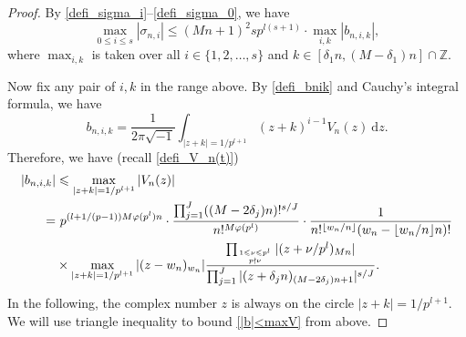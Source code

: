 \documentclass[12pt]{article}
\numberwithin{equation}{section}
\begin{document}
\begin{proof}
By \eqref{defi_sigma_i}--\eqref{defi_sigma_0}, we have
\begin{equation}\label{sigma<b}
\max_{0 \leqslant i \leqslant s} |\sigma_{n,i}| \leqslant (Mn+1)^{2}sp^{l(s+1)} \cdot \max_{i,k} |b_{n,i,k}|, 
\end{equation}
where $\max_{i,k}$ is taken over all $i \in \{ 1,2,\ldots,s \}$ and $k \in [\delta_1n, (M-\delta_1)n] \cap \mathbb{Z}$. 

Now fix any pair of $i,k$ in the range above. By \eqref{defi_bnik} and Cauchy's integral formula, we have
\[ b_{n,i,k} = \frac{1}{2\pi \sqrt{-1}} \int_{|z+k|=1/p^{l+1}} (z+k)^{i-1}V_n(z)~\mathrm{d}z. \]
Therefore, we have (recall \eqref{defi_V_n(t)})
\begin{align}
	|b_{n,i,k}| &\leqslant \max_{|z+k| = 1/p^{l+1}} |V_n(z)| \notag\\
	=&~ p^{(l+1/(p-1))M\varphi(p^{l})n} \cdot \frac{\prod_{j=1}^{J} ((M-2\delta_j)n)!^{s/J}}{n!^{M\varphi(p^{l})}} \cdot \frac{1}{n!^{\lfloor w_n / n\rfloor}(w_n-\lfloor w_n / n\rfloor n)!} \notag \\
	& \times \max_{|z+k|=1/p^{l+1}} |(z-w_n)_{w_n}| \frac{\prod_{1 \leqslant \nu \leqslant p^{l} \atop p \nmid \nu} |(z+\nu/p^{l})_{Mn}|}{\prod_{j=1}^{J} |(z+\delta_j n)_{(M-2\delta_j)n+1}|^{s/J}}. \label{|b|<maxV}
\end{align}
In the following, the complex number $z$ is always on the circle $|z+k|=1/p^{l+1}$. We will use triangle inequality to bound \eqref{|b|<maxV} from above. 


\end{proof}
\end{document}
